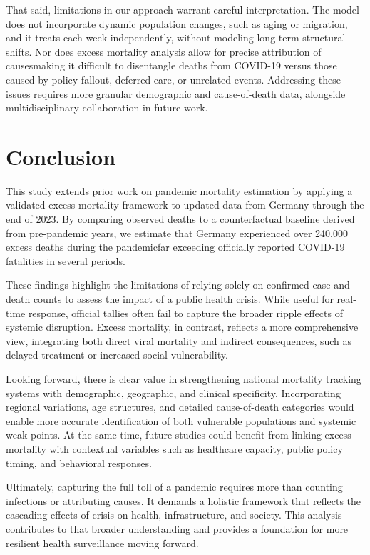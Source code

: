 \documentclass[a4paper,11pt]{article}
\begin{document}
That said, limitations in our approach warrant careful interpretation. The model does not incorporate dynamic population changes, such as aging or migration, and it treats each week independently, without modeling long-term structural shifts. Nor does excess mortality analysis allow for precise attribution of causes\textemdash making it difficult to disentangle deaths from COVID-19 versus those caused by policy fallout, deferred care, or unrelated events. Addressing these issues requires more granular demographic and cause-of-death data, alongside multidisciplinary collaboration in future work.

\section{Conclusion}

This study extends prior work on pandemic mortality estimation by applying a validated excess mortality framework to updated data from Germany through the end of 2023. By comparing observed deaths to a counterfactual baseline derived from pre-pandemic years, we estimate that Germany experienced over 240,000 excess deaths during the pandemic\textemdash far exceeding officially reported COVID-19 fatalities in several periods.

These findings highlight the limitations of relying solely on confirmed case and death counts to assess the impact of a public health crisis. While useful for real-time response, official tallies often fail to capture the broader ripple effects of systemic disruption. Excess mortality, in contrast, reflects a more comprehensive view, integrating both direct viral mortality and indirect consequences, such as delayed treatment or increased social vulnerability.

Looking forward, there is clear value in strengthening national mortality tracking systems with demographic, geographic, and clinical specificity. Incorporating regional variations, age structures, and detailed cause-of-death categories would enable more accurate identification of both vulnerable populations and systemic weak points. At the same time, future studies could benefit from linking excess mortality with contextual variables such as healthcare capacity, public policy timing, and behavioral responses.

Ultimately, capturing the full toll of a pandemic requires more than counting infections or attributing causes. It demands a holistic framework that reflects the cascading effects of crisis on health, infrastructure, and society. This analysis contributes to that broader understanding and provides a foundation for more resilient health surveillance moving forward.


\end{document}
